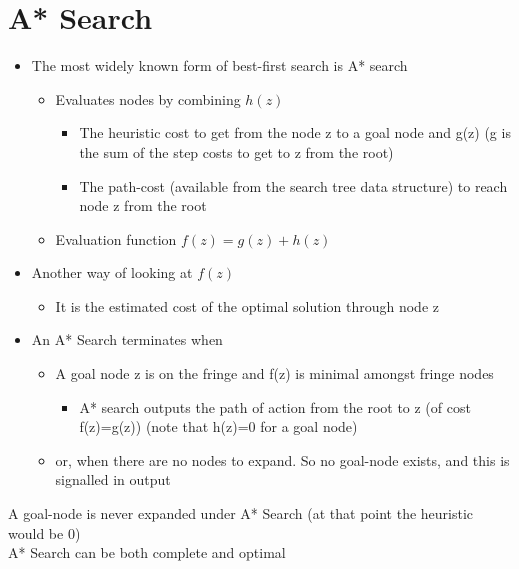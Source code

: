 \documentclass{article}[18pt]
\begin{document}
\section{A* Search}
\begin{itemize}
	\item The most widely known form of best-first search is A* search
	\begin{itemize}
		\item Evaluates nodes by combining $h(z)$
		\begin{itemize}
			\item The heuristic cost to get from the node z to a goal node and g(z) (g is the sum of the step costs to get to z from the root)
			\item The path-cost (available from the search tree data structure) to reach node z from the root
		\end{itemize}
		\item Evaluation function $f(z)=g(z)+h(z)$
	\end{itemize}
	\item Another way of looking at $f(z)$
	\begin{itemize}
		\item It is the estimated cost of the optimal solution through node z
	\end{itemize}
	\item An A* Search terminates when
	\begin{itemize}
		\item A goal node z is on the fringe and f(z) is minimal amongst fringe nodes
		\begin{itemize}
			\item A* search outputs the path of action from the root to z (of cost f(z)=g(z)) (note that h(z)=0 for a goal node)
		\end{itemize}
		\item or, when there are no nodes to expand. So no goal-node exists, and this is signalled in output
	\end{itemize}
\end{itemize}
\begin{important}[A* Search]
A goal-node is never expanded under A* Search (at that point the heuristic would be 0)\\
A* Search can be both complete and optimal
\end{important}
\end{document}
